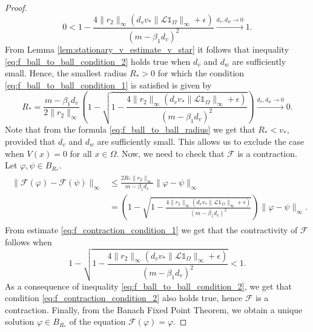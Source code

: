 \documentclass[review,onefignum,onetabnum]{SIAM-styles/siamart171218}
\begin{document}
\begin{proof}
\begin{equation}
        \label{eq:f_ball_to_ball_condition_2}
        0
        <1 
        -
        \frac{4\|r_2\|_\infty(d_v v_* \|\mathcal{L}\mathds{1}_\Omega\|_\infty + \epsilon)}{(m - \beta_1 d_v)^2}
        \xrightarrow{d_v, d_w \rightarrow 0}
        1.
    \end{equation}
    From Lemma \ref{lem:stationary_v_estimate_v_star} it follows that inequality \eqref{eq:f_ball_to_ball_condition_2} holds true when $d_v$ and $d_w$ are sufficiently small. Hence, the smallest radius $R_* > 0$ for which the condition \eqref{eq:f_ball_to_ball_condition_1} is satisfied is given by
    \begin{equation}
        \label{eq:f_ball_to_ball_radius}
        R_* = \frac{m - \beta_1 d_v}{2 \|r_2\|_\infty}
        \left(1 - 
        \sqrt{ 
        1 
        -
        \frac{4\|r_2\|_\infty(d_v v_* \|\mathcal{L}\mathds{1}_\Omega\|_\infty + \epsilon)}{(m - \beta_1 d_v)^2}
        }
        \right)
        \xrightarrow{d_v, d_w \rightarrow 0} 0.
    \end{equation}
    Note that from the formula \eqref{eq:f_ball_to_ball_radius} we get that $R_* < v_*$, provided that $d_v$ and $d_w$ are sufficiently small. This allows us to exclude the case when $V(x) = 0$ for all $x \in \Omega$. Now, we need to check that $\mathcal{F}$ is a contraction. Let $\varphi, \psi \in B_{R_*}$.
    \begin{align}
        \label{eq:f_contraction_condition_1}
        \begin{split}
            \| \mathcal{F}(\varphi) - \mathcal{F}(\psi) \|_\infty 
            &\leq
            \frac{
            2 R_*\|r_2\|_\infty}{ m - \beta_1 d_v } \|\varphi - \psi\|_\infty \\
            &=
            \left(1 - 
            \sqrt{ 
            1 
            -
            \frac{4\|r_2\|_\infty(d_v v_* \|\mathcal{L}\mathds{1}_\Omega\|_\infty + \epsilon)}{(m - \beta_1 d_v)^2}
            }
            \right)  \|\varphi - \psi\|_\infty
            .
        \end{split}
    \end{align}
    From estimate \eqref{eq:f_contraction_condition_1} we get that the contractivity of $\mathcal{F}$ follows when
    \begin{equation}
        \label{eq:f_contraction_condition_2}
        1 - 
        \sqrt{ 
        1 
        -
        \frac{4\|r_2\|_\infty(d_v v_* \|\mathcal{L}\mathds{1}_\Omega\|_\infty + \epsilon)}{(m - \beta_1 d_v)^2}
        }
        <
        1.
    \end{equation}
    As a consequence of inequality \eqref{eq:f_ball_to_ball_condition_2}, we get that condition \eqref{eq:f_contraction_condition_2} also holds true, hence $\mathcal{F}$ is a contraction. Finally, from the Banach Fixed Point Theorem, we obtain a unique solution $\varphi \in B_{R_*}$ of the equation $\mathcal{F}(\varphi) = \varphi$. 
\end{proof}
\end{document}
